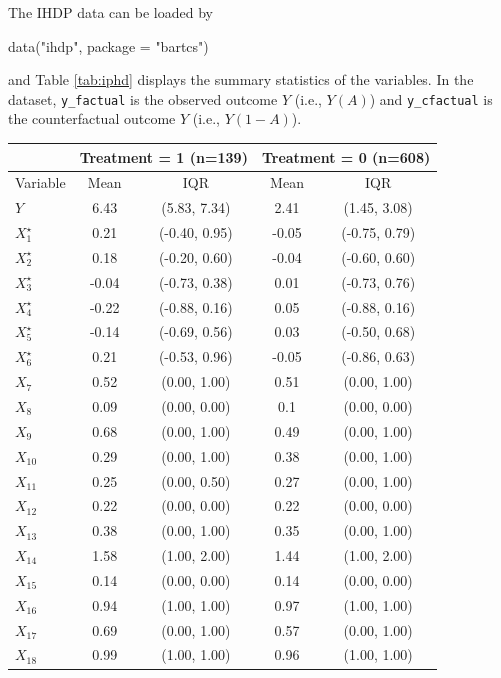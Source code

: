 The IHDP data can be loaded by
\begin{example}
data("ihdp", package = "bartcs")
\end{example}
and Table \ref{tab:iphd} displays the summary statistics of the variables. In the dataset, \verb|y_factual| is the observed outcome $Y$ (i.e., $Y(A)$) and \verb|y_cfactual| is the counterfactual outcome $Y$ (i.e., $Y(1-A)$).
\begin{table}[ht]
\centering
\begin{tabular}{l|cc|cc}
   & \multicolumn{2}{c|}{Treatment = 1 (n=139)}& \multicolumn{2}{c}{Treatment = 0 (n=608)} \\ \hline
Variable & Mean & IQR & Mean & IQR \\
   \hline
$Y$ & 6.43 & (5.83, 7.34) & 2.41 & (1.45, 3.08) \\
  $X^{\star}_{1}$ & 0.21 & (-0.40, 0.95) & -0.05 & (-0.75, 0.79) \\
  $X^{\star}_{2}$ & 0.18 & (-0.20, 0.60) & -0.04 & (-0.60, 0.60) \\
  $X^{\star}_{3}$ & -0.04 & (-0.73, 0.38) & 0.01 & (-0.73, 0.76) \\
  $X^{\star}_{4}$ & -0.22 & (-0.88, 0.16) & 0.05 & (-0.88, 0.16) \\
  $X^{\star}_{5}$ & -0.14 & (-0.69, 0.56) & 0.03 & (-0.50, 0.68) \\
  $X^{\star}_{6}$ & 0.21 & (-0.53, 0.96) & -0.05 & (-0.86, 0.63) \\
  $X_{7}$ & 0.52 & (0.00, 1.00) & 0.51 & (0.00, 1.00) \\
  $X_{8}$ & 0.09 & (0.00, 0.00) & 0.1 & (0.00, 0.00) \\
  $X_{9}$ & 0.68 & (0.00, 1.00) & 0.49 & (0.00, 1.00) \\
  $X_{10}$ & 0.29 & (0.00, 1.00) & 0.38 & (0.00, 1.00) \\
  $X_{11}$ & 0.25 & (0.00, 0.50) & 0.27 & (0.00, 1.00) \\
  $X_{12}$ & 0.22 & (0.00, 0.00) & 0.22 & (0.00, 0.00) \\
  $X_{13}$ & 0.38 & (0.00, 1.00) & 0.35 & (0.00, 1.00) \\
  $X_{14}$ & 1.58 & (1.00, 2.00) & 1.44 & (1.00, 2.00) \\
  $X_{15}$ & 0.14 & (0.00, 0.00) & 0.14 & (0.00, 0.00) \\
  $X_{16}$ & 0.94 & (1.00, 1.00) & 0.97 & (1.00, 1.00) \\
  $X_{17}$ & 0.69 & (0.00, 1.00) & 0.57 & (0.00, 1.00) \\
  $X_{18}$ & 0.99 & (1.00, 1.00) & 0.96 & (1.00, 1.00) \\

\end{tabular}
\end{table}
